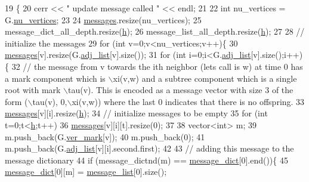 \begin{DoxyCode}
19 \{
20   cerr << \textcolor{stringliteral}{" update message called "} << endl;
21 
22   \textcolor{keywordtype}{int} nu\_vertices = G.\hyperlink{classmarked__graph_acf79c6aeb8f32614cb14a5baaa6c9f9b}{nu\_vertices};
23 
24   \hyperlink{classgraph__message_aac77e098f0acf9650116a8e51fe3b4b7}{messages}.resize(nu\_vertices);
25   message\_dict\_all\_depth.resize(\hyperlink{classgraph__message_a934d63ed7275c211e13c6fb68824ed46}{h});
26   message\_list\_all\_depth.resize(\hyperlink{classgraph__message_a934d63ed7275c211e13c6fb68824ed46}{h});
27 
28   \textcolor{comment}{// initialize the messages}
29   \textcolor{keywordflow}{for} (\textcolor{keywordtype}{int} v=0;v<nu\_vertices;v++)\{
30     \hyperlink{classgraph__message_aac77e098f0acf9650116a8e51fe3b4b7}{messages}[v].resize(G.\hyperlink{classmarked__graph_a1a0bf7ca413a278763f7c878b3b6fd6f}{adj\_list}[v].size());
31     \textcolor{keywordflow}{for} (\textcolor{keywordtype}{int} i=0;i<G.\hyperlink{classmarked__graph_a1a0bf7ca413a278763f7c878b3b6fd6f}{adj\_list}[v].size();i++)\{
32       \textcolor{comment}{// the message from v towards the ith neighbor (lets call is w) at time 0 has a mark component which
       is \(\backslash\)xi(v,w) and a subtree component which is a single root with mark \(\backslash\)tau(v). This is encoded as a message
       vector with size 3 of the form (\(\backslash\)tau(v), 0,\(\backslash\)xi(v,w)) where the last 0 indicates that there is no offspring.}
33       \hyperlink{classgraph__message_aac77e098f0acf9650116a8e51fe3b4b7}{messages}[v][i].resize(\hyperlink{classgraph__message_a934d63ed7275c211e13c6fb68824ed46}{h});
34       \textcolor{comment}{// initialize messages to be empty}
35       \textcolor{keywordflow}{for} (\textcolor{keywordtype}{int} t=0;t<\hyperlink{classgraph__message_a934d63ed7275c211e13c6fb68824ed46}{h};t++)
36         \hyperlink{classgraph__message_aac77e098f0acf9650116a8e51fe3b4b7}{messages}[v][i][t].resize(0);
37 
38       vector<int> m;
39       m.push\_back(G.\hyperlink{classmarked__graph_ac83e9377dd4d8bb95be1ac949b127296}{ver\_mark}[v]);
40       m.push\_back(0);
41       m.push\_back(G.\hyperlink{classmarked__graph_a1a0bf7ca413a278763f7c878b3b6fd6f}{adj\_list}[v][i].second.first);
42 
43       \textcolor{comment}{// adding this message to the message dictionary}
44       \textcolor{keywordflow}{if} (message\_dictnd(m) == \hyperlink{classgraph__message_ad0a6d35ac8550fb7ff03ce90fce7d5a5}{message\_dict}[0].end())\{
45         \hyperlink{classgraph__message_ad0a6d35ac8550fb7ff03ce90fce7d5a5}{message\_dict}[0][m] = \hyperlink{classgraph__message_aa17fdb629b423343edfafa97252763ef}{message\_list}[0].size();

\end{DoxyCode}
